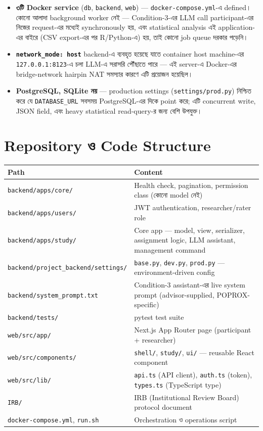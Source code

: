 \documentclass[11pt,a4paper]{article}
\newcommand{\code}[1]{\texttt{\small #1}}
\newcommand{\file}[1]{\texttt{\small #1}}
\begin{document}
\begin{itemize}
\item \textbf{৩টি Docker service} (\code{db}, \code{backend}, \code{web}) --- \file{docker-compose.yml}-এ
  defined। কোনো আলাদা background worker নেই --- Condition-3-এর LLM call participant-এর
  নিজের request-এর মধ্যেই synchronously হয়, এবং statistical analysis এই application-এর
  বাইরে (CSV export-এর পর R/Python-এ) হয়, তাই কোনো job queue দরকার পড়েনি।
\item \textbf{\code{network\_mode: host}} backend-এ ব্যবহৃত হয়েছে যাতে container host machine-এর
  \code{127.0.0.1:8123}-এ চলা LLM-এ সরাসরি পৌঁছাতে পারে --- এই server-এ Docker-এর bridge-network
  hairpin NAT সমস্যার কারণে এটি প্রয়োজন হয়েছিল।
\item \textbf{PostgreSQL, SQLite নয়} --- production settings (\file{settings/prod.py}) নিশ্চিত
  করে যে \code{DATABASE\_URL} সবসময় PostgreSQL-এর দিকে point করে; এটি concurrent write, JSON
  field, এবং heavy statistical read-query-র জন্য বেশি উপযুক্ত।
\end{itemize}

\newpage
\section{Repository ও Code Structure}

\begin{longtable}{@{}p{6.0cm}p{9.4cm}@{}}
\toprule
\textbf{Path} & \textbf{Content} \\
\midrule
\endhead
\file{backend/apps/core/} & Health check, pagination, permission class (কোনো model নেই) \\
\file{backend/apps/users/} & JWT authentication, researcher/rater role \\
\file{backend/apps/study/} & Core app --- model, view, serializer, assignment logic, LLM
  assistant, management command \\
\file{backend/project\_backend/settings/} & \file{base.py}, \file{dev.py}, \file{prod.py}
  --- environment-driven config \\
\file{backend/system\_prompt.txt} & Condition-3 assistant-এর live system prompt (advisor-supplied,
  POPROX-specific) \\
\file{backend/tests/} & pytest test suite \\
\file{web/src/app/} & Next.js App Router page (participant \;+\; researcher) \\
\file{web/src/components/} & \file{shell/}, \file{study/}, \file{ui/} --- reusable React
  component \\
\file{web/src/lib/} & \file{api.ts} (API client), \file{auth.ts} (token), \file{types.ts}
  (TypeScript type) \\
\file{IRB/} & IRB (Institutional Review Board) protocol document \\
\file{docker-compose.yml}, \file{run.sh} & Orchestration ও operations script \\
\bottomrule
\end{longtable}
\end{document}
